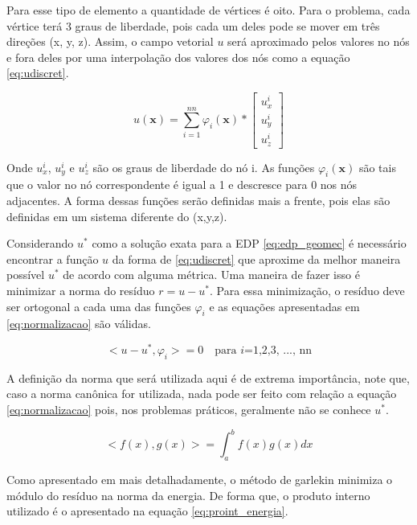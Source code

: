 Para esse tipo de elemento a quantidade de vértices é oito. Para o problema, cada vértice terá 3 graus de liberdade, pois cada um deles pode se mover em três direções (x, y, z). Assim, o campo vetorial $u$ será aproximado pelos valores no nós e fora deles por uma interpolação dos valores dos nós como a equação \ref{eq:udiscret}.


\begin{equation}\label{eq:udiscret}
u(\mathbf{x}) = \sum_{i=1}^{nn} \varphi_i(\mathbf{x}) * \begin{bmatrix}
u^i_x \\ u^i_y \\ u^i_z
\end{bmatrix}
\end{equation}

Onde $u^i_x$, $u^i_y$ e $u^i_z$ são os graus de liberdade do nó i. As funções $\varphi_i(\mathbf{x})$ são tais que o valor no nó correspondente é igual a 1 e descresce para 0 nos nós adjacentes. A forma dessas funções serão definidas mais a frente, pois elas são definidas em um sistema diferente do (x,y,z).


Considerando $u^*$ como a solução exata para a EDP \ref{eq:edp_geomec} é necessário encontrar a função $u$ da forma de \ref{eq:udiscret} que aproxime da melhor maneira possível $u^*$ de acordo com alguma métrica. Uma maneira de fazer isso é minimizar a norma do resíduo $r = u-u^*$. Para essa minimização, o resíduo  deve ser ortogonal a cada uma das funções $\varphi_i$ e as equações apresentadas em \ref{eq:normalizacao} são válidas.


\begin{equation}\label{eq:normalizacao}
<u-u^*, \varphi_i> = 0   \quad  \text{para $i$=1,2,3, ..., nn}
\end{equation}

A definição da norma que será utilizada aqui é de extrema importância, note que, caso a norma canônica for utilizada, nada pode ser feito com relação a equação \ref{eq:normalizacao} pois, nos problemas práticos, geralmente não se conhece $u^*$.

\begin{equation}
    <f(x), g(x)> = \int^b_af(x)g(x) dx
\end{equation}

Como apresentado em \cite{CompGeomec} mais detalhadamente, o método de garlekin minimiza o módulo do resíduo na norma da energia. De forma que, o produto interno utilizado é o apresentado na equação \ref{eq:proint_energia}.



